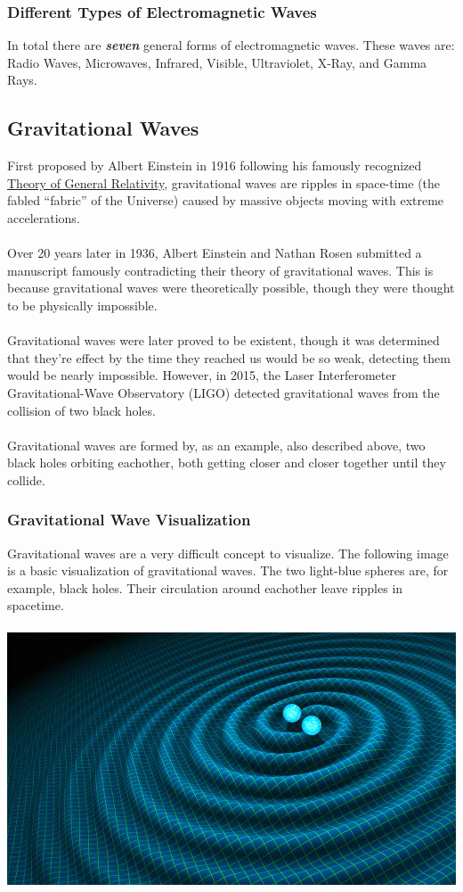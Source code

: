 \documentclass{article}
\begin{document}
\subsubsection{Different Types of Electromagnetic Waves}
In total there are \textbf{\textit{seven}} general forms of electromagnetic waves. These waves are: Radio Waves, Microwaves, Infrared, Visible, Ultraviolet, X-Ray, and Gamma Rays.
\subsection{Gravitational Waves}
First proposed by Albert Einstein in 1916 following his famously recognized \hyperref[sec:generalrelativity]{Theory of General Relativity}, gravitational waves are ripples in space-time (the fabled “fabric” of the Universe) caused by massive objects moving with extreme accelerations.\\\\
Over 20 years later in 1936, Albert Einstein and Nathan Rosen submitted a manuscript famously contradicting their theory of gravitational waves. This is because gravitational waves were theoretically possible, though they were thought to be physically impossible. \\\\
Gravitational waves were later proved to be existent, though it was determined that they're effect by the time they reached us would be so weak, detecting them would be nearly impossible. However, in 2015, the Laser Interferometer Gravitational-Wave Observatory (LIGO) detected gravitational waves from the collision of two black holes.\\\\
Gravitational waves are formed by, as an example, also described above, two black holes orbiting eachother, both getting closer and closer together until they collide.

\subsubsection{Gravitational Wave Visualization}
Gravitational waves are a very difficult concept to visualize. The following image is a basic visualization of gravitational waves. The two light-blue spheres are, for example, black holes. Their circulation around eachother leave ripples in spacetime.\\\\
\includegraphics[scale=0.33]{images/gravitational_waves.png}
\end{document}
